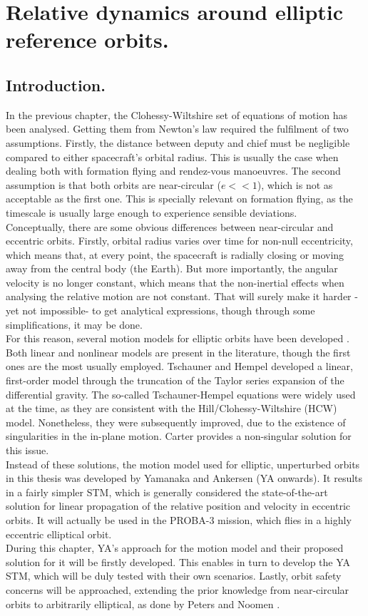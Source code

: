 \chapter{Relative dynamics around elliptic reference orbits.}
%
\label{chap:Chap_3}
%
\section{Introduction.}
%
\indent In the previous chapter, the Clohessy-Wiltshire set of equations of motion has been analysed. Getting them from Newton's law required the fulfilment of two assumptions. Firstly, the distance between deputy and chief must be negligible compared to either spacecraft's orbital radius. This is usually the case when dealing both with formation flying and rendez-vous manoeuvres. The second assumption is that both orbits are near-circular ($e<<1$), which is not as acceptable as the first one. This is specially relevant on formation flying, as the timescale is usually large enough to experience sensible deviations. \\
%
\indent Conceptually, there are some obvious differences between near-circular and eccentric orbits. Firstly, orbital radius varies over time for non-null eccentricity, which means that, at every point, the spacecraft is radially closing or moving away from the central body (\ie the Earth). But more importantly, the angular velocity is no longer constant, which means that the non-inertial effects when analysing the relative motion are not constant. That will surely make it harder -yet not impossible- to get analytical expressions, though through some simplifications, it may be done.\\
%
\indent For this reason, several motion models for elliptic orbits have been developed \cite{Sullivan}. Both linear and nonlinear models are present in the literature, though the first ones are the most usually employed. Tschauner and Hempel \cite{Tschauner_Hempel} developed a linear, first-order model through the truncation of the Taylor series expansion of the differential gravity. The so-called Tschauner-Hempel equations were widely used at the time, as they are consistent with the Hill/Clohessy-Wiltshire (HCW) model. Nonetheless, they were subsequently improved, due to the existence of singularities in the in-plane motion. Carter \cite{Carter} provides a non-singular solution for this issue. \\
%
\indent Instead of these solutions, the motion model used for elliptic, unperturbed orbits in this thesis was developed by Yamanaka and Ankersen \cite{Yamanaka_Ankersen} (YA onwards). It results in a fairly simpler STM, which is generally considered the state-of-the-art solution for linear propagation of the relative position and velocity in eccentric orbits. It will actually be used in the PROBA-3 mission, which flies in a highly eccentric elliptical orbit.\\
%
\indent During this chapter, YA's approach for the motion model and their proposed solution for it will be firstly developed. This enables in turn to develop the YA STM, which will be duly tested with their own scenarios. Lastly, orbit safety concerns will be approached, extending the prior knowledge from near-circular orbits to arbitrarily elliptical, as done by Peters and Noomen \cite{Peters_Noomen}.
%
